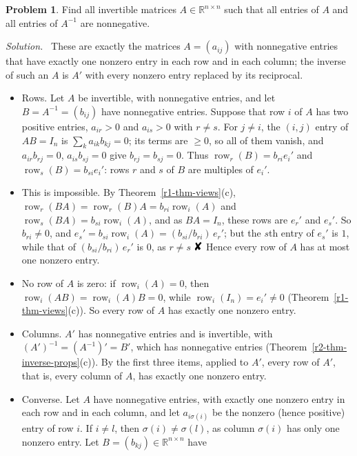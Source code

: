 \documentclass[12pt]{article}
\newcommand{\R}{\mathbb R}
\newcommand{\contradiction}{\mathord{\text{\large\ding{56}}}}
\DeclareMathOperator{\row}{row}
\theoremstyle{definition}
\newtheorem{problem}{Problem}
\newenvironment{solution}{\par\noindent\textit{Solution.}\ }{\par\smallskip}
\begin{document}
\begin{problem}\label{r2-ex-pr-nonneg-inverse}
Find all invertible matrices \(A\in\R^{n\times n}\) such that all entries of \(A\) and all entries of \(A^{-1}\) are
nonnegative.
\end{problem}
\begin{solution}
These are exactly the matrices \(A=(a_{ij})\) with nonnegative entries that have exactly one nonzero entry in each row
and in each column; the inverse of such an \(A\) is \(A'\) with every nonzero entry replaced by its reciprocal.
\begin{itemize}
\item Rows. Let \(A\) be invertible, with nonnegative entries, and let \(B=A^{-1}=(b_{ij})\) have nonnegative entries.
Suppose that row \(i\) of \(A\) has two positive entries, \(a_{ir}>0\) and \(a_{is}>0\) with \(r\ne s\). For \(j\ne i\),
the \((i,j)\) entry of \(AB=I_n\) is \(\sum_ka_{ik}b_{kj}=0\); its terms are \(\geqslant0\), so all of them vanish, and
\(a_{ir}b_{rj}=0\), \(a_{is}b_{sj}=0\) give \(b_{rj}=b_{sj}=0\). Thus \(\row_r(B)=b_{ri}e_i'\) and
\(\row_s(B)=b_{si}e_i'\): rows \(r\) and \(s\) of \(B\) are multiples of \(e_i'\).
\item This is impossible. By Theorem~\ref{r1-thm-views}(c), \(\row_r(BA)=\row_r(B)A=b_{ri}\row_i(A)\) and
\(\row_s(BA)=b_{si}\row_i(A)\), and as \(BA=I_n\), these rows are \(e_r'\) and \(e_s'\). So \(b_{ri}\ne0\), and
\(e_s'=b_{si}\row_i(A)=(b_{si}/b_{ri})\,e_r'\); but the \(s\)th entry of \(e_s'\) is \(1\), while that of
\((b_{si}/b_{ri})\,e_r'\) is \(0\), as \(r\ne s\) \(\contradiction\) Hence every row of \(A\) has at most one nonzero
entry.
\item No row of \(A\) is zero: if \(\row_i(A)=0\), then \(\row_i(AB)=\row_i(A)B=0\), while \(\row_i(I_n)=e_i'\ne0\)
(Theorem~\ref{r1-thm-views}(c)). So every row of \(A\) has exactly one nonzero entry.
\item Columns. \(A'\) has nonnegative entries and is invertible, with \((A')^{-1}=(A^{-1})'=B'\), which has nonnegative
entries (Theorem~\ref{r2-thm-inverse-props}(c)). By the first three items, applied to \(A'\), every row of \(A'\), that
is, every column of \(A\), has exactly one nonzero entry.
\item Converse. Let \(A\) have nonnegative entries, with exactly one nonzero entry in each row and in each column, and
let \(a_{i\sigma(i)}\) be the nonzero (hence positive) entry of row \(i\). If \(i\ne l\), then
\(\sigma(i)\ne\sigma(l)\), as column \(\sigma(i)\) has only one nonzero entry. Let \(B=(b_{kj})\in\R^{n\times n}\) have

\end{itemize}
\end{solution}
\end{document}
